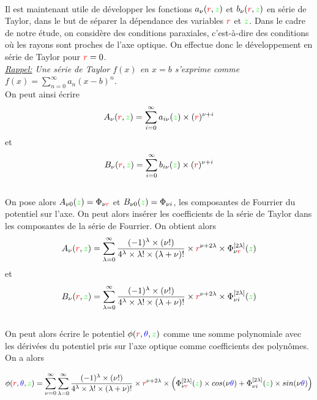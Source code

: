 \documentclass{report}
\begin{document}
\
\\
Il est maintenant utile de développer les fonctions $a_\nu ({\color{red}r},{\color{green}z})$ et $b_\nu ({\color{red}r},{\color{green}z})$
en série de Taylor, dans le but de séparer la dépendance des variables ${\color{red}r}$ et ${\color{green}z}$. 
Dans le cadre de notre étude, on considère des conditions paraxiales, c'est-à-dire des conditions où les rayons sont proches de l'axe optique. On effectue
donc le développement en série de Taylor pour ${\color{red}r}=0$.
\
\\
{\textit{
{\underline{Rappel:}} 
Une série de Taylor $f(x)$ en $x=b$ s'exprime comme $f(x)=\sum\limits_{n=0}^{\infty} a_n(x-b)^n$. 
}}
\
\\
On peut ainsi écrire 
\[
A_\nu ({\color{red}r},{\color{green}z})=\sum\limits_{i=0}^{\infty} a_{i\nu} ({\color{green}z}) \times ({\color{red}r})^{\nu + i}
\]
et 
\[
B_\nu ({\color{red}r},{\color{green}z})=\sum\limits_{i=0}^{\infty} b_{i\nu} ({\color{green}z}) \times ({\color{red}r})^{\nu + i}
\]
\
\\ 
On pose alors $A_{\nu 0} ({\color{green}z})=\Phi_{\nu {\color{red}r}}$ et $B_{\nu 0} ({\color{green}z})=\Phi_{\nu i}$, les composantes 
de Fourrier du potentiel sur l'axe. On peut alors insérer les coefficients de la série de Taylor dans les composantes de la série de 
Fourrier. On obtient alors 
\[
A_\nu ({\color{red}r},{\color{green}z})=\sum\limits_{\lambda=0}^{\infty} \frac{(-1)^{\lambda}\times (\nu !)}{4^{\lambda}\times \lambda !\times (\lambda +\nu)!}
\times {\color{red}r}^{\nu +2\lambda} \times \Phi_{\nu {\color{red}r}}^{[2\lambda]}({\color{green}z}) 
\]
et 
\[
B_\nu ({\color{red}r},{\color{green}z})=\sum\limits_{\lambda=0}^{\infty} \frac{(-1)^{\lambda}\times (\nu !)}{4^{\lambda}\times \lambda !\times (\lambda +\nu)!}
\times {\color{red}r}^{\nu +2\lambda} \times \Phi_{\nu i}^{[2\lambda]}({\color{green}z}) 
\]
\
\\
On peut alors écrire le potentiel $\phi ({\color{red}r},{\color{blue}\theta},{\color{green}z})$ comme une somme polynomiale avec les dérivées du potentiel pris sur 
l'axe optique comme coefficients des polynômes. On a alors 

\[
\phi ({\color{red}r},{\color{blue}\theta},{\color{green}z})= \sum\limits_{\nu =0}^{\infty}
\sum\limits_{\lambda=0}^{\infty} \frac{(-1)^{\lambda}\times (\nu !)}{4^{\lambda}\times \lambda !\times (\lambda +\nu)!}
\times {\color{red}r}^{\nu +2\lambda} \times \left(\Phi_{\nu {\color{red}r}}^{[2\lambda]}({\color{green}z})\times cos(\nu{\color{blue}\theta}) + 
\Phi_{\nu i}^{[2\lambda]}({\color{green}z})\times sin(\nu{\color{blue}\theta}) \right)
\]
\end{document}
